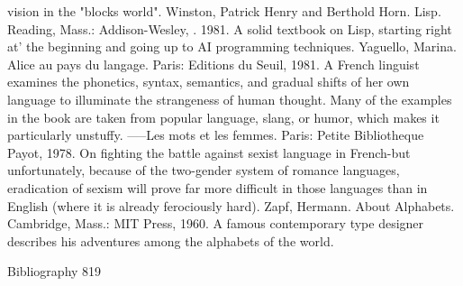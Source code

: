   vision in the "blocks world".
Winston, Patrick Henry and Berthold Horn. Lisp. Reading, Mass.: Addison-Wesley, . 1981. A
  solid textbook on Lisp, starting right at' the beginning and going up to AI programming
  techniques.
Yaguello, Marina. Alice au pays du langage. Paris: Editions du Seuil, 1981. A French linguist
  examines the phonetics, syntax, semantics, and gradual shifts of her own language to
  illuminate the strangeness of human thought. Many of the examples in the book are taken
  from popular language, slang, or humor, which makes it particularly unstuffy.
-----Les mots et les femmes. Paris: Petite Bibliotheque Payot, 1978. On fighting the battle
  against sexist language in French-but unfortunately, because of the two-gender system of
  romance languages, eradication of sexism will prove far more difficult in those languages
  than in English (where it is already ferociously hard).
Zapf, Hermann. About Alphabets. Cambridge, Mass.: MIT Press, 1960. A famous
  contemporary type designer describes his adventures among the alphabets of the world.




Bibliography                                                                              819

